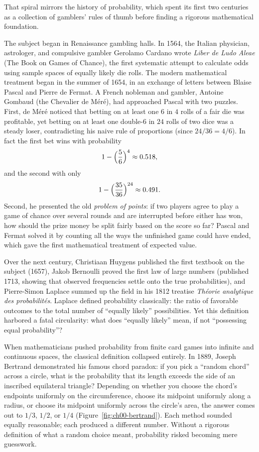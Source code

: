 \begin{historybox}
That spiral mirrors the history of probability, which spent its first two
centuries as a collection of gamblers' rules of thumb before finding a rigorous
mathematical foundation.

The subject began in Renaissance gambling halls. In 1564, the Italian physician,
astrologer, and compulsive gambler Gerolamo Cardano wrote \emph{Liber de Ludo
Aleae} (The Book on Games of Chance), the first systematic attempt to calculate
odds using sample spaces of equally likely die rolls. The modern mathematical
treatment began in the summer of 1654, in an exchange of letters between Blaise Pascal
and Pierre de Fermat. A French nobleman and gambler, Antoine Gombaud (the
Chevalier de M\'er\'e), had approached Pascal with two puzzles. First, de M\'er\'e
noticed that betting on at least one $6$ in $4$ rolls of a fair die was profitable,
yet betting on at least one double-$6$ in $24$ rolls of two dice was a steady
loser, contradicting his naive rule of proportions (since $24/36 = 4/6$). In
fact the first bet wins with probability
\[
  1 - \Bigl(\frac{5}{6}\Bigr)^4 \approx 0.518,
\]
and the second with only
\[
  1 - \Bigl(\frac{35}{36}\Bigr)^{24} \approx 0.491.
\]
Second,
he presented the old \emph{problem of points}: if two players agree to play a game
of chance over several rounds and are interrupted before either has won, how should
the prize money be split fairly based on the score so far? Pascal and Fermat solved
it by counting all the ways the unfinished game could have ended, which gave
the first mathematical treatment of expected value.

Over the next century, Christiaan Huygens published the first textbook on the
subject (1657), Jakob Bernoulli proved the first law of large numbers (published
1713, showing that observed frequencies settle onto the true probabilities), and Pierre-Simon
Laplace summed up the field in his 1812 treatise \emph{Th\'eorie
analytique des probabilit\'es}. Laplace defined probability classically: the
ratio of favorable outcomes to the total number of ``equally likely'' possibilities.
Yet this definition harbored a fatal circularity: what does ``equally likely''
mean, if not ``possessing equal probability''?

When mathematicians pushed probability from finite card games into infinite and
continuous spaces, the classical definition collapsed entirely. In 1889, Joseph
Bertrand demonstrated his famous chord paradox: if you pick a ``random chord''
across a circle, what is the probability that its length exceeds the side of an
inscribed equilateral triangle? Depending on whether you choose the chord's
endpoints uniformly on the circumference, choose its midpoint uniformly along a
radius, or choose its midpoint uniformly across the circle's area, the answer comes
out to $1/3$, $1/2$, or $1/4$ (Figure~\ref{fig:ch00-bertrand}). Each method sounded equally reasonable; each produced
a different number. Without a rigorous definition of what a random choice meant,
probability risked becoming mere guesswork.


\end{historybox}
